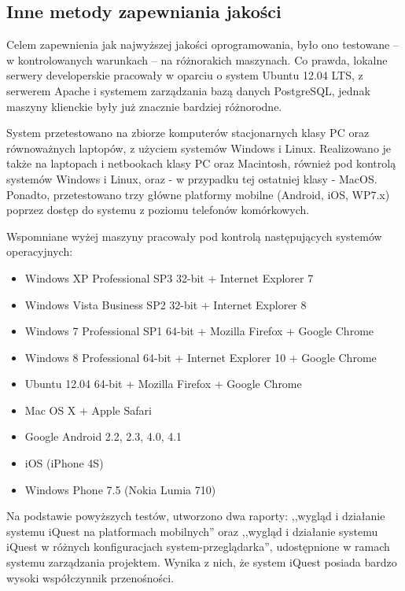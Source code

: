 \subsection{Inne metody zapewniania jakości}
\label{Chapter714}

Celem zapewnienia jak najwyższej jakości oprogramowania, było ono testowane -- w kontrolowanych warunkach -- na różnorakich maszynach. Co prawda, lokalne serwery developerskie pracowały w oparciu o system Ubuntu 12.04 LTS, z serwerem Apache i systemem zarządzania bazą danych PostgreSQL, jednak maszyny klienckie były już znacznie bardziej różnorodne.

System przetestowano na zbiorze komputerów stacjonarnych klasy PC oraz równoważnych laptopów, z użyciem systemów Windows i Linux. Realizowano je także na laptopach i netbookach klasy PC oraz Macintosh, również pod kontrolą systemów Windows i Linux, oraz - w przypadku tej ostatniej klasy - MacOS. Ponadto, przetestowano trzy główne platformy mobilne (Android, iOS, WP7.x) poprzez dostęp do systemu z poziomu telefonów komórkowych.

Wspomniane wyżej maszyny pracowały pod kontrolą następujących systemów operacyjnych:
\begin{itemize}
\item{Windows XP Professional SP3 32-bit + Internet Explorer 7}
\item{Windows Vista Business SP2 32-bit + Internet Explorer 8}
\item{Windows 7 Professional SP1 64-bit + Mozilla Firefox + Google Chrome}
\item{Windows 8 Professional 64-bit + Internet Explorer 10 + Google Chrome}
\item{Ubuntu 12.04 64-bit + Mozilla Firefox + Google Chrome}
\item{Mac OS X + Apple Safari}
\item{Google Android 2.2, 2.3, 4.0, 4.1}
\item{iOS (iPhone 4S)}
\item{Windows Phone 7.5 (Nokia Lumia 710)}
\end{itemize}

Na podstawie powyższych testów, utworzono dwa raporty: ,,wygląd i działanie systemu iQuest na platformach mobilnych'' oraz ,,wygląd i działanie systemu iQuest w różnych konfiguracjach system-przeglądarka'', udostępnione w ramach systemu zarządzania projektem\cite{Redmine:ProjDocs}. Wynika z nich, że system iQuest posiada bardzo wysoki współczynnik przenośności.